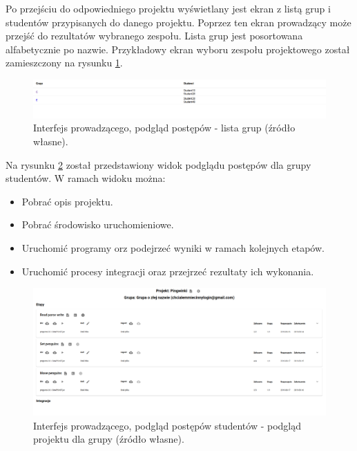 Po przejściu do odpowiedniego projektu wyświetlany jest ekran z listą grup i studentów przypisanych do danego projektu.
Poprzez ten ekran prowadzący może przejść do rezultatów wybranego zespołu.
Lista grup jest posortowana alfabetycznie po nazwie.
Przykładowy ekran wyboru zespołu projektowego został zamieszczony na rysunku \ref{fig:lecturer_preview_groups}.

\begin{figure}[h]
    \centering
    \includegraphics[width = 13cm]{chapter04/lecturer_preview_groups.png}
    \caption{Interfejs prowadzącego, podgląd postępów - lista grup (źródło własne).}
    \label{fig:lecturer_preview_groups}
\end{figure}

Na rysunku \ref{fig:lecturer-interface-preview} został przedstawiony widok podglądu postępów dla grupy studentów.
W ramach widoku można:
\begin{itemize}
    \item Pobrać opis projektu.
    \item Pobrać środowisko uruchomieniowe.
    \item Uruchomić programy orz podejrzeć wyniki w ramach kolejnych etapów.
    \item Uruchomić procesy integracji oraz przejrzeć rezultaty ich wykonania.
\end{itemize}

\begin{figure}[h]
    \centering
    \includegraphics[width = 13cm]{chapter04/lecturer_interface_preview.png}
    \caption{Interfejs prowadzącego, podgląd postępów studentów - podgląd projektu dla grupy (źródło własne).}
    \label{fig:lecturer-interface-preview}
\end{figure}


